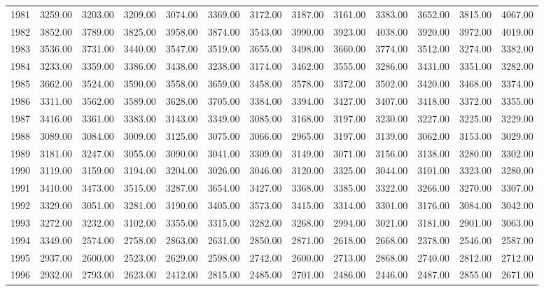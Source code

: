 \begin{longtable}{rrrrrrrrrrrrr}
  1981 & 3259.00 & 3203.00 & 3209.00 & 3074.00 & 3369.00 & 3172.00 & 3187.00 & 3161.00 & 3383.00 & 3652.00 & 3815.00 & 4067.00 \\ 
  1982 & 3852.00 & 3789.00 & 3825.00 & 3958.00 & 3874.00 & 3543.00 & 3990.00 & 3923.00 & 4038.00 & 3920.00 & 3972.00 & 4019.00 \\ 
  1983 & 3536.00 & 3731.00 & 3440.00 & 3547.00 & 3519.00 & 3655.00 & 3498.00 & 3660.00 & 3774.00 & 3512.00 & 3274.00 & 3382.00 \\ 
  1984 & 3233.00 & 3359.00 & 3386.00 & 3438.00 & 3238.00 & 3174.00 & 3462.00 & 3555.00 & 3286.00 & 3431.00 & 3351.00 & 3282.00 \\ 
  1985 & 3662.00 & 3524.00 & 3590.00 & 3558.00 & 3659.00 & 3458.00 & 3578.00 & 3372.00 & 3502.00 & 3420.00 & 3468.00 & 3374.00 \\ 
  1986 & 3311.00 & 3562.00 & 3589.00 & 3628.00 & 3705.00 & 3384.00 & 3394.00 & 3427.00 & 3407.00 & 3418.00 & 3372.00 & 3355.00 \\ 
  1987 & 3416.00 & 3361.00 & 3383.00 & 3143.00 & 3349.00 & 3085.00 & 3168.00 & 3197.00 & 3230.00 & 3227.00 & 3225.00 & 3229.00 \\ 
  1988 & 3089.00 & 3084.00 & 3009.00 & 3125.00 & 3075.00 & 3066.00 & 2965.00 & 3197.00 & 3139.00 & 3062.00 & 3153.00 & 3029.00 \\ 
  1989 & 3181.00 & 3247.00 & 3055.00 & 3090.00 & 3041.00 & 3309.00 & 3149.00 & 3071.00 & 3156.00 & 3138.00 & 3280.00 & 3302.00 \\ 
  1990 & 3119.00 & 3159.00 & 3194.00 & 3204.00 & 3026.00 & 3046.00 & 3120.00 & 3325.00 & 3044.00 & 3101.00 & 3323.00 & 3280.00 \\ 
  1991 & 3410.00 & 3473.00 & 3515.00 & 3287.00 & 3654.00 & 3427.00 & 3368.00 & 3385.00 & 3322.00 & 3266.00 & 3270.00 & 3307.00 \\ 
  1992 & 3329.00 & 3051.00 & 3281.00 & 3190.00 & 3405.00 & 3573.00 & 3415.00 & 3314.00 & 3301.00 & 3176.00 & 3084.00 & 3042.00 \\ 
  1993 & 3272.00 & 3232.00 & 3102.00 & 3355.00 & 3315.00 & 3282.00 & 3268.00 & 2994.00 & 3021.00 & 3181.00 & 2901.00 & 3063.00 \\ 
  1994 & 3349.00 & 2574.00 & 2758.00 & 2863.00 & 2631.00 & 2850.00 & 2871.00 & 2618.00 & 2668.00 & 2378.00 & 2546.00 & 2587.00 \\ 
  1995 & 2937.00 & 2600.00 & 2523.00 & 2629.00 & 2598.00 & 2742.00 & 2600.00 & 2713.00 & 2868.00 & 2740.00 & 2812.00 & 2712.00 \\ 
  1996 & 2932.00 & 2793.00 & 2623.00 & 2412.00 & 2815.00 & 2485.00 & 2701.00 & 2486.00 & 2446.00 & 2487.00 & 2855.00 & 2671.00 \\ 

\end{longtable}
